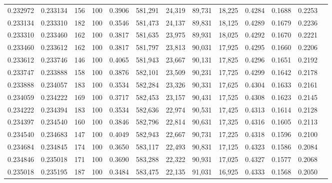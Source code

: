 \begin{tabular}{rrrrrrrrrrrrr}
0.232972 & 0.233134 &   156 & 100 &                                     0.3906 & 581,291 &  24,319 &  89,731 &  18,225 & 0.4284 & 0.1688 & 0.2253 \\
0.233134 & 0.233310 &   182 & 100 &                                     0.3546 & 581,473 &  24,137 &  89,831 &  18,125 & 0.4289 & 0.1679 & 0.2236 \\
0.233310 & 0.233460 &   162 & 100 &                                     0.3817 & 581,635 &  23,975 &  89,931 &  18,025 & 0.4292 & 0.1670 & 0.2221 \\
0.233460 & 0.233612 &   162 & 100 &                                     0.3817 & 581,797 &  23,813 &  90,031 &  17,925 & 0.4295 & 0.1660 & 0.2206 \\
0.233612 & 0.233746 &   146 & 100 &                                     0.4065 & 581,943 &  23,667 &  90,131 &  17,825 & 0.4296 & 0.1651 & 0.2192 \\
0.233747 & 0.233888 &   158 & 100 &                                     0.3876 & 582,101 &  23,509 &  90,231 &  17,725 & 0.4299 & 0.1642 & 0.2178 \\
0.233888 & 0.234057 &   183 & 100 &                                     0.3534 & 582,284 &  23,326 &  90,331 &  17,625 & 0.4304 & 0.1633 & 0.2161 \\
0.234059 & 0.234222 &   169 & 100 &                                     0.3717 & 582,453 &  23,157 &  90,431 &  17,525 & 0.4308 & 0.1623 & 0.2145 \\
0.234222 & 0.234394 &   183 & 100 &                                     0.3534 & 582,636 &  22,974 &  90,531 &  17,425 & 0.4313 & 0.1614 & 0.2128 \\
0.234397 & 0.234540 &   160 & 100 &                                     0.3846 & 582,796 &  22,814 &  90,631 &  17,325 & 0.4316 & 0.1605 & 0.2113 \\
0.234540 & 0.234683 &   147 & 100 &                                     0.4049 & 582,943 &  22,667 &  90,731 &  17,225 & 0.4318 & 0.1596 & 0.2100 \\
0.234684 & 0.234845 &   174 & 100 &                                     0.3650 & 583,117 &  22,493 &  90,831 &  17,125 & 0.4323 & 0.1586 & 0.2084 \\
0.234846 & 0.235018 &   171 & 100 &                                     0.3690 & 583,288 &  22,322 &  90,931 &  17,025 & 0.4327 & 0.1577 & 0.2068 \\
0.235018 & 0.235195 &   187 & 100 &                                     0.3484 & 583,475 &  22,135 &  91,031 &  16,925 & 0.4333 & 0.1568 & 0.2050 \\

\end{tabular}
